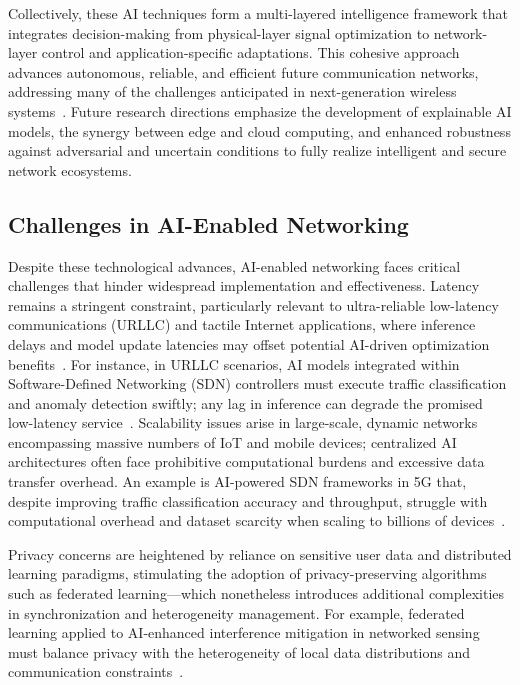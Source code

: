 \documentclass[sigconf]{acmart}
\begin{document}
Collectively, these AI techniques form a multi-layered intelligence framework that integrates decision-making from physical-layer signal optimization to network-layer control and application-specific adaptations. This cohesive approach advances autonomous, reliable, and efficient future communication networks, addressing many of the challenges anticipated in next-generation wireless systems~\cite{ref11,ref49,ref50}. Future research directions emphasize the development of explainable AI models, the synergy between edge and cloud computing, and enhanced robustness against adversarial and uncertain conditions to fully realize intelligent and secure network ecosystems.

\subsection{Challenges in AI-Enabled Networking}

Despite these technological advances, AI-enabled networking faces critical challenges that hinder widespread implementation and effectiveness. Latency remains a stringent constraint, particularly relevant to ultra-reliable low-latency communications (URLLC) and tactile Internet applications, where inference delays and model update latencies may offset potential AI-driven optimization benefits~\cite{ref26,ref27}. For instance, in URLLC scenarios, AI models integrated within Software-Defined Networking (SDN) controllers must execute traffic classification and anomaly detection swiftly; any lag in inference can degrade the promised low-latency service~\cite{ref52}. Scalability issues arise in large-scale, dynamic networks encompassing massive numbers of IoT and mobile devices; centralized AI architectures often face prohibitive computational burdens and excessive data transfer overhead. An example is AI-powered SDN frameworks in 5G that, despite improving traffic classification accuracy and throughput, struggle with computational overhead and dataset scarcity when scaling to billions of devices~\cite{ref28,ref52}. 

Privacy concerns are heightened by reliance on sensitive user data and distributed learning paradigms, stimulating the adoption of privacy-preserving algorithms such as federated learning—which nonetheless introduces additional complexities in synchronization and heterogeneity management. For example, federated learning applied to AI-enhanced interference mitigation in networked sensing must balance privacy with the heterogeneity of local data distributions and communication constraints~\cite{ref29,ref48,ref52}. 
\end{document}
